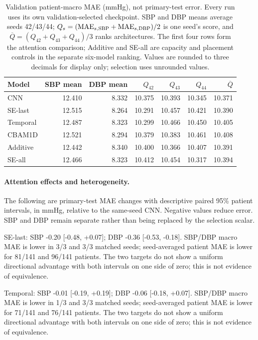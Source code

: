 \documentclass[11pt]{article}
\begin{document}
\begin{table}[t]\centering\small\setlength{\tabcolsep}{5pt}
\begin{tabular}{lrrrrrr}\toprule
Model & SBP mean & DBP mean & $Q_{42}$ & $Q_{43}$ & $Q_{44}$ & $\overline{Q}$\\\midrule
CNN & 12.410 & 8.332 & 10.375 & 10.393 & 10.345 & 10.371\\
SE-last & 12.515 & 8.264 & 10.291 & 10.457 & 10.421 & 10.390\\
Temporal & 12.487 & 8.323 & 10.299 & 10.466 & 10.450 & 10.405\\
CBAM1D & 12.521 & 8.294 & 10.379 & 10.383 & 10.461 & 10.408\\
\midrule
Additive & 12.442 & 8.340 & 10.400 & 10.366 & 10.407 & 10.391\\
SE-all & 12.466 & 8.323 & 10.412 & 10.454 & 10.317 & 10.394\\
\bottomrule\end{tabular}
\caption{Validation patient-macro MAE (mmHg), not primary-test error. Every run uses its own validation-selected checkpoint. SBP and DBP means average seeds 42/43/44; $Q_s=({\rm MAE}_{s,\rm SBP}+{\rm MAE}_{s,\rm DBP})/2$ is one seed's score, and $\overline{Q}=(Q_{42}+Q_{43}+Q_{44})/3$ ranks architectures. The first four rows form the attention comparison; Additive and SE-all are capacity and placement controls in the separate six-model ranking. Values are rounded to three decimals for display only; selection uses unrounded values.}\label{tab:attention_validation}\end{table}

\paragraph{Attention effects and heterogeneity.}

The following are primary-test MAE changes with descriptive paired 95\% patient intervals, in mmHg, relative to the same-seed CNN. Negative values reduce error. SBP and DBP remain separate rather than being replaced by the selection scalar.

SE-last: SBP -0.20 [-0.48, +0.07]; DBP -0.36 [-0.53, -0.18]. SBP/DBP macro MAE is lower in 3/3 and 3/3 matched seeds; seed-averaged patient MAE is lower for 81/141 and 96/141 patients. The two targets do not show a uniform directional advantage with both intervals on one side of zero; this is not evidence of equivalence.

Temporal: SBP -0.01 [-0.19, +0.19]; DBP -0.06 [-0.18, +0.07]. SBP/DBP macro MAE is lower in 1/3 and 3/3 matched seeds; seed-averaged patient MAE is lower for 71/141 and 76/141 patients. The two targets do not show a uniform directional advantage with both intervals on one side of zero; this is not evidence of equivalence.
\end{document}
